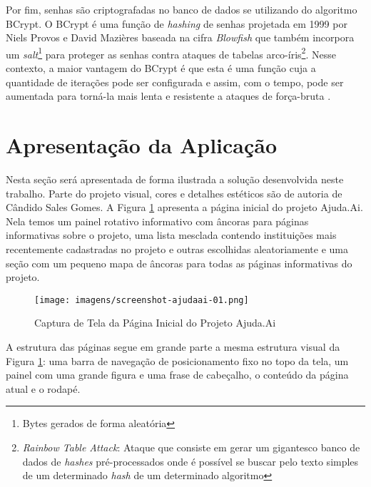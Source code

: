 Por fim, senhas são criptografadas no banco de dados se utilizando do algoritmo BCrypt. O BCrypt é uma função de \emph{hashing} de senhas projetada em 1999 por Niels Provos e David Mazières baseada na cifra \emph{Blowfish} que também incorpora um \emph{salt}\footnote{Bytes gerados de forma aleatória} para proteger as senhas contra ataques de tabelas arco-íris\footnote{\emph{Rainbow Table Attack}: Ataque que consiste em gerar um gigantesco banco de dados de \emph{hashes} pré-processados onde é possível se buscar pelo texto simples de um determinado \emph{hash} de um determinado algoritmo}. Nesse contexto, a maior vantagem do BCrypt é que esta é uma função cuja a quantidade de iterações pode ser configurada e assim, com o tempo, pode ser aumentada para torná-la mais lenta e resistente a ataques de força-bruta \cite{wiki:Bcrypt}.





\section{Apresentação da Aplicação} \label{sec:ajudaai:apresentacao}

Nesta seção será apresentada de forma ilustrada a solução desenvolvida neste trabalho. Parte do projeto visual, cores e detalhes estéticos são de autoria de Cândido Sales Gomes. A Figura \ref{fig:ss_ajudaai_01} apresenta a página inicial do projeto Ajuda.Ai. Nela temos um painel rotativo informativo com âncoras para páginas informativas sobre o projeto, uma lista mesclada contendo instituições mais recentemente cadastradas no projeto e outras escolhidas aleatoriamente e uma seção com um pequeno mapa de âncoras para todas as páginas informativas do projeto.

\begin{figure}[H]
	\caption{\label{fig:ss_ajudaai_01}Captura de Tela da Página Inicial do Projeto Ajuda.Ai}
    \centering
    \texttt{[image: imagens/screenshot-ajudaai-01.png]}
\end{figure}

A estrutura das páginas segue em grande parte a mesma estrutura visual da Figura \ref{fig:ss_ajudaai_01}: uma barra de navegação de posicionamento fixo no topo da tela, um painel com uma grande figura e uma frase de cabeçalho, o conteúdo da página atual e o rodapé.

